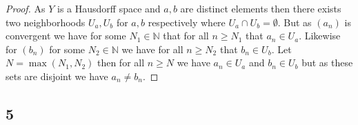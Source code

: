 \documentclass{amsart}
\theoremstyle{plain}
\theoremstyle{definition}
\theoremstyle{remark}
\begin{document}
\begin{proof}
    As $Y$ is a Hausdorff space and $a,b$ are distinct elements then there exists two neighborhoods $U_a,U_b$ for $a,b$ respectively where $U_a\cap U_b=\emptyset$. But as $(a_n)$ is convergent we have for some $N_1\in \mathbb{N}$ that for all $n\geq N_1$ that $a_n\in U_a$. Likewise for $(b_n)$ for some $N_2\in \mathbb{N}$ we have for all $n\geq N_2$ that $b_n\in U_b$. Let $N=\max(N_1,N_2)$ then for all $n\geq N$ we have $a_n\in U_a$ and $b_n\in U_b$ but as these sets are disjoint we have $a_n\not = b_n$. 
\end{proof}

\subsection*{5}
\end{document}
